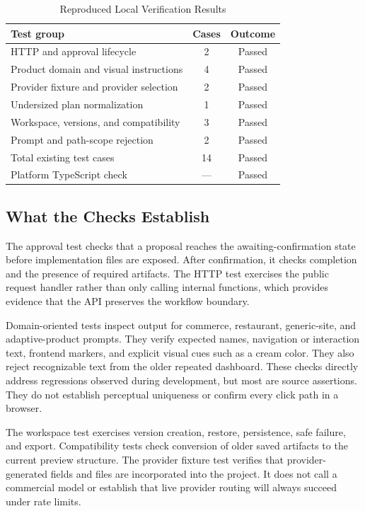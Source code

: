 \documentclass[conference,a4paper]{IEEEtran}
\begin{document}
\begin{table}[t]
\caption{Reproduced Local Verification Results}
\label{tab:results}
\centering\footnotesize
\begin{tabularx}{\columnwidth}{@{}Ycc@{}}
\toprule
Test group & Cases & Outcome \\
\midrule
HTTP and approval lifecycle & 2 & Passed \\
Product domain and visual instructions & 4 & Passed \\
Provider fixture and provider selection & 2 & Passed \\
Undersized plan normalization & 1 & Passed \\
Workspace, versions, and compatibility & 3 & Passed \\
Prompt and path-scope rejection & 2 & Passed \\
\midrule
Total existing test cases & 14 & Passed \\
Platform TypeScript check & --- & Passed \\
\bottomrule
\end{tabularx}
\end{table}

\subsection{What the Checks Establish}
The approval test checks that a proposal reaches the awaiting-confirmation state before implementation files are exposed. After confirmation, it checks completion and the presence of required artifacts. The HTTP test exercises the public request handler rather than only calling internal functions, which provides evidence that the API preserves the workflow boundary.

Domain-oriented tests inspect output for commerce, restaurant, generic-site, and adaptive-product prompts. They verify expected names, navigation or interaction text, frontend markers, and explicit visual cues such as a cream color. They also reject recognizable text from the older repeated dashboard. These checks directly address regressions observed during development, but most are source assertions. They do not establish perceptual uniqueness or confirm every click path in a browser.

The workspace test exercises version creation, restore, persistence, safe failure, and export. Compatibility tests check conversion of older saved artifacts to the current preview structure. The provider fixture test verifies that provider-generated fields and files are incorporated into the project. It does not call a commercial model or establish that live provider routing will always succeed under rate limits.
\end{document}
